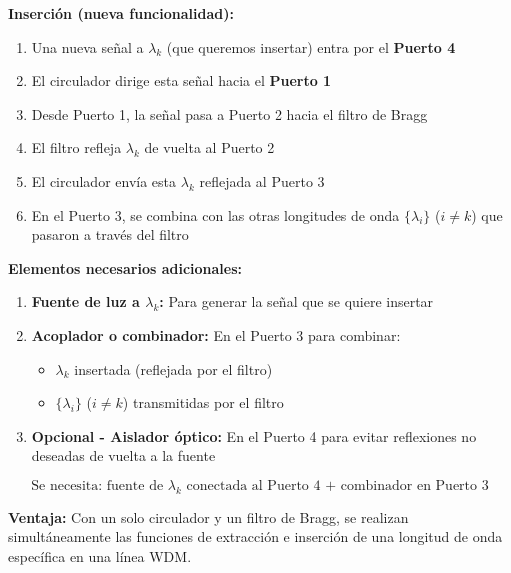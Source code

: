 \documentclass[12pt,a4paper]{article}
\begin{document}
\textbf{Inserción (nueva funcionalidad):}
\begin{enumerate}
    \item Una nueva señal a $\lambda_k$ (que queremos insertar) entra por el \textbf{Puerto 4}
    
    \item El circulador dirige esta señal hacia el \textbf{Puerto 1}
    
    \item Desde Puerto 1, la señal pasa a Puerto 2 hacia el filtro de Bragg
    
    \item El filtro refleja $\lambda_k$ de vuelta al Puerto 2
    
    \item El circulador envía esta $\lambda_k$ reflejada al Puerto 3
    
    \item En el Puerto 3, se combina con las otras longitudes de onda $\{\lambda_i\}$ ($i \neq k$) que pasaron a través del filtro
\end{enumerate}

\textbf{Elementos necesarios adicionales:}

\begin{enumerate}
    \item \textbf{Fuente de luz a $\lambda_k$:} Para generar la señal que se quiere insertar
    
    \item \textbf{Acoplador o combinador:} En el Puerto 3 para combinar:
    \begin{itemize}
        \item $\lambda_k$ insertada (reflejada por el filtro)
        \item $\{\lambda_i\}$ ($i \neq k$) transmitidas por el filtro
    \end{itemize}
    
    \item \textbf{Opcional - Aislador óptico:} En el Puerto 4 para evitar reflexiones no deseadas de vuelta a la fuente
\end{enumerate}

\begin{equation}
\boxed{\text{Se necesita: fuente de } \lambda_k \text{ conectada al Puerto 4 + combinador en Puerto 3}}
\end{equation}

\textbf{Ventaja:} Con un solo circulador y un filtro de Bragg, se realizan simultáneamente las funciones de extracción e inserción de una longitud de onda específica en una línea WDM.
\end{document}
